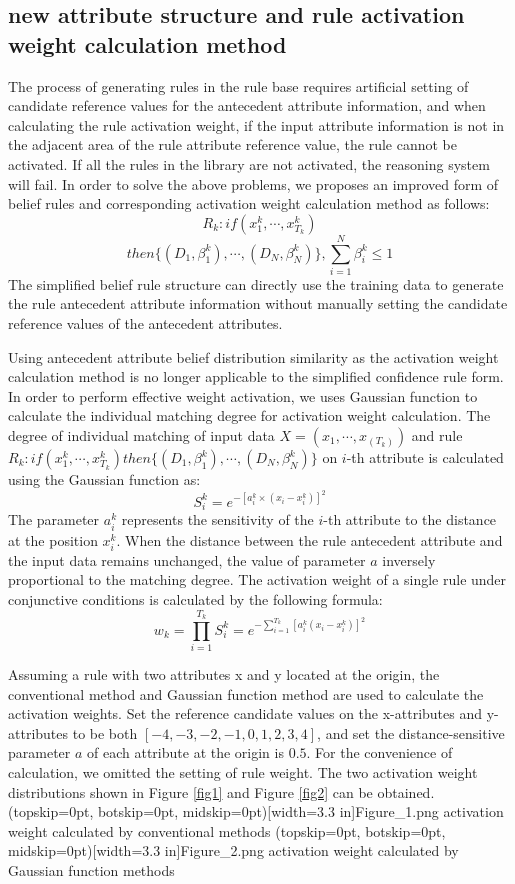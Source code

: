 \documentclass{ieeeaccess}
\begin{document}
\subsection{new attribute structure and rule activation weight calculation method}
The process of generating rules in the rule base requires artificial setting of candidate reference values for the antecedent attribute information,
and when calculating the rule activation weight, if the input attribute information is not in the adjacent area of the rule attribute reference value, the rule cannot be activated.
If all the rules in the library are not activated, the reasoning system will fail. In order to solve the above problems, we proposes an improved form of belief rules and corresponding activation weight calculation method as follows:
$$R_k:if(x_1^k , \cdots , x_{T_k}^k)$$
$$then\{(D_1,\beta_1^k),\cdots,(D_N,\beta_N^k)\},\sum_{i=1}^N\beta_i^k\leq1$$
The simplified belief rule structure can directly use the training data to generate the rule antecedent attribute information without manually setting the candidate reference values of the antecedent attributes.

Using antecedent attribute belief distribution similarity as the activation weight calculation method is no longer applicable to the simplified confidence rule form. In order to perform effective weight activation,
we uses Gaussian function to calculate the individual matching degree for activation weight calculation.
The degree of individual matching of input data $X=(x_1,\cdots,x_(T_k))$ and rule $R_k:if(x_1^k , \cdots , x_{T_k}^k)then\{(D_1,\beta_1^k),\cdots,(D_N,\beta_N^k)\}$ on $i$-th attribute is calculated using the Gaussian function as:
$$S_i^k=e^{-[a_i^k\times(x_i-x_i^k)]^2}$$
The parameter $a_i^k$ represents the sensitivity of the $i$-th attribute to the distance at the position $x_i^k$. When the distance between the rule antecedent attribute and the input data remains unchanged,
the value of parameter $a$ inversely proportional to the matching degree.
The activation weight of a single rule under conjunctive conditions is calculated by the following formula:
$$w_k=\prod_{i=1}^{T_k}S_i^k=e^{-\sum_{i=1}^{T_k}[a_i^k(x_i-x_i^k)]^2}$$


Assuming a rule with two attributes x and y located at the origin, the conventional method and Gaussian function method are used to calculate the activation weights.
Set the reference candidate values on the x-attributes and y-attributes to be both $[-4,-3,-2,-1,0,1,2,3,4]$,
and set the distance-sensitive parameter $a$ of each attribute at the origin is $0.5$.
For the convenience of calculation, we omitted the setting of rule weight.
The two activation weight distributions shown in Figure \ref{fig1} and Figure \ref{fig2} can be obtained.
\Figure[!t](topskip=0pt, botskip=0pt, midskip=0pt)[width=3.3 in]{Figure_1.png}
{activation weight calculated by conventional methods\label{fig1}}
\Figure[!t](topskip=0pt, botskip=0pt, midskip=0pt)[width=3.3 in]{Figure_2.png}
{activation weight calculated by Gaussian function methods\label{fig2}}
\end{document}
